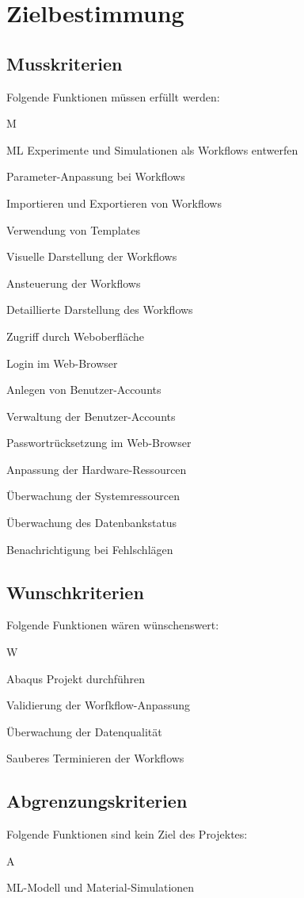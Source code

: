 \section{Zielbestimmung}

\subsection{Musskriterien}
    Folgende Funktionen müssen erfüllt werden:
    \begin{enumPH}{M}
        \item ML Experimente und Simulationen als Workflows entwerfen
        \item Parameter-Anpassung bei Workflows
        \item Importieren und Exportieren von Workflows
        \item Verwendung von Templates
        \item Visuelle Darstellung der Workflows
        \item Ansteuerung der Workflows
        \item Detaillierte Darstellung des Workflows
        \item Zugriff durch Weboberfläche
        \item Login im Web-Browser
        \item Anlegen von Benutzer-Accounts
        \item Verwaltung der Benutzer-Accounts
        \item Passwortrücksetzung im Web-Browser
        \item Anpassung der Hardware-Ressourcen
        \item Überwachung der Systemressourcen
        \item Überwachung des Datenbankstatus
        \item Benachrichtigung bei Fehlschlägen
    \end{enumPH}
        
        
\subsection{Wunschkriterien}
    Folgende Funktionen wären wünschenswert:
    \begin{enumPH}{W}
        \item Abaqus Projekt durchführen
        \item Validierung der Worfkflow-Anpassung
        \item Überwachung der Datenqualität
        \item Sauberes Terminieren der Workflows
    \end{enumPH}


\subsection{Abgrenzungskriterien}
    Folgende Funktionen sind kein Ziel des Projektes:
    \begin{enumPH}{A}
        \item ML-Modell und Material-Simulationen
    \end{enumPH}

\newpage